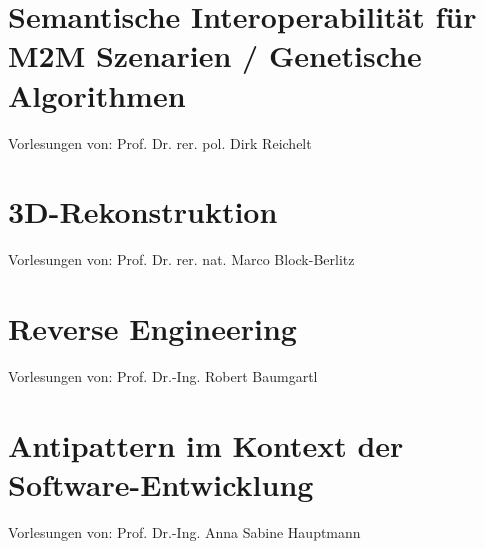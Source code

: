 \chapter{Semantische Interoperabilität für M2M Szenarien / Genetische Algorithmen}
Vorlesungen von: Prof. Dr. rer. pol. Dirk Reichelt

\chapter{3D-Rekonstruktion}
Vorlesungen von: Prof. Dr. rer. nat. Marco Block-Berlitz

\chapter{Reverse Engineering}
Vorlesungen von: Prof. Dr.-Ing. Robert Baumgartl

\chapter{Antipattern im Kontext der Software-Entwicklung}
Vorlesungen von: Prof. Dr.-Ing. Anna Sabine Hauptmann







 
